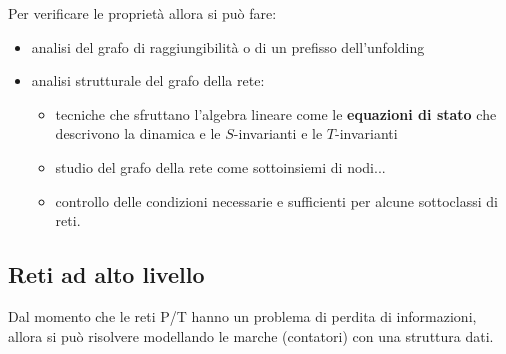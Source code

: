 Per verificare le proprietà allora si può fare:
\begin{itemize}
    \item analisi del grafo di raggiungibilità o di un prefisso dell'unfolding
    \item analisi strutturale del grafo della rete:
          \begin{itemize}
              \item tecniche che sfruttano l'algebra lineare come le \textbf{equazioni
                        di stato} che descrivono la dinamica e le $S$-invarianti
                    e le $T$-invarianti
              \item studio del grafo della rete come sottoinsiemi di nodi...
              \item controllo delle condizioni necessarie e sufficienti per alcune
                    sottoclassi di reti.
          \end{itemize}
\end{itemize}


\subsection{Reti ad alto livello}
Dal momento che le reti P/T hanno un problema di perdita di informazioni, allora
si può risolvere modellando le marche (contatori) con una struttura dati.